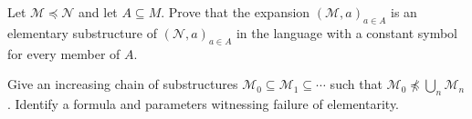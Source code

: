 \begin{exercise}
\label{ex:maps-elementarity-02}
Let \(\mathcal M\preccurlyeq\mathcal N\) and let \(A\subseteq M\).  Prove that
the expansion \((\mathcal M,a)_{a\in A}\) is an elementary substructure of
\((\mathcal N,a)_{a\in A}\) in the language with a constant symbol for every
member of \(A\).
\end{exercise}

\begin{exercise}
\label{ex:maps-elementarity-03}
Give an increasing chain of substructures
\(\mathcal M_0\subseteq\mathcal M_1\subseteq\cdots\) such that
\(\mathcal M_0\not\preccurlyeq\bigcup_n\mathcal M_n\).  Identify a formula
and parameters witnessing failure of elementarity.
\end{exercise}

